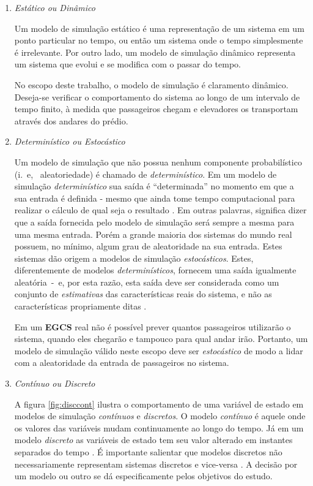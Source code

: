 \begin{enumerate}
\item \textit{Estático ou Dinâmico}

Um modelo de simulação estático é uma representação de um sistema em um ponto
particular no tempo, ou então um sistema onde o tempo simplesmente é
irrelevante. Por outro lado, um modelo de simulação dinâmico representa um
sistema que evolui e se modifica com o passar do tempo.

No escopo deste trabalho, o modelo de simulação é claramento dinâmico. Deseja-se
verificar o comportamento do sistema ao longo de um intervalo de tempo finito, à
medida que passageiros chegam e elevadores os transportam através dos andares do
prédio.

\item \textit{Determinístico ou Estocástico}

Um modelo de simulação que não possua nenhum componente probabilístico (i.~e,~
aleatoriedade) é chamado de \textit{determinístico}. Em um modelo de simulação
\textit{determinístico} sua saída é ``determinada'' no momento em que a sua
entrada é definida - mesmo que ainda tome tempo computacional para realizar o
cálculo de qual seja o resultado \cite{Law}. Em outras palavras, significa dizer
que a saída fornecida pelo modelo de simulação será sempre a mesma para uma
mesma entrada. Porém a grande maioria dos sistemas do mundo real possuem, no
mínimo, algum grau de aleatoridade na sua entrada. Estes sistemas dão origem a
modelos de simulação \textit{estocásticos}. Estes, diferentemente de modelos
\textit{determinísticos}, fornecem uma saída igualmente aleatória~-~e, por esta
razão, esta saída deve ser considerada como um conjunto de \textit{estimativas}
das características reais do sistema, e não as características propriamente
ditas \cite{Banks}.

Em um \textbf{EGCS} real não é possível prever quantos passageiros utilizarão o
sistema, quando eles chegarão e tampouco para qual andar irão. Portanto, um
modelo de simulação válido neste escopo deve ser \textit{estocástico} de modo a
lidar com a aleatoridade da entrada de passageiros no sistema.

\item \textit{Contínuo ou Discreto}

A figura \ref{fig:disccont} ilustra o comportamento de uma variável de estado em
modelos de simulação \textit{contínuos} e \textit{discretos}. O modelo
\textit{contínuo} é aquele onde os valores das variáveis mudam continuamente ao
longo do tempo. Já em um modelo \textit{discreto} as variáveis de estado tem seu
valor alterado em instantes separados do tempo \cite{Banks}. É importante
salientar que modelos discretos não necessariamente representam sistemas
discretos e vice-versa \cite{Law}. A decisão por um modelo ou outro se dá
especificamente pelos objetivos do estudo.


\end{enumerate}
